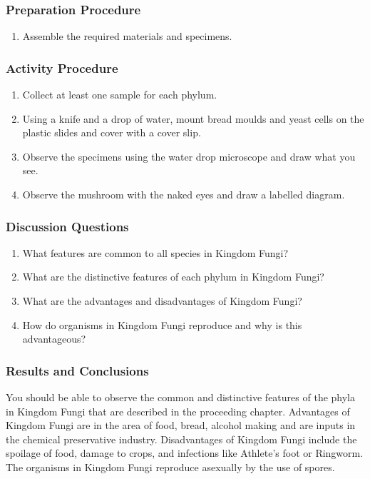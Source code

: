 \subsubsection*{Preparation Procedure}
\begin{enumerate}
\item{Assemble the required materials and specimens.}
\end{enumerate}

\subsubsection*{Activity Procedure}
\begin{enumerate}
\item{Collect at least one sample for each phylum.}
\item{Using a knife and a drop of water, mount bread moulds and yeast cells on the plastic slides and cover with a cover slip.}
\item{Observe the specimens using the water drop microscope and draw what you see.}
\item{Observe the mushroom with the naked eyes and draw a labelled diagram.}
\end{enumerate}

\subsubsection*{Discussion Questions}
\begin{enumerate}
\item{What features are common to all species in Kingdom Fungi?}
\item{What are the distinctive features of each phylum in Kingdom Fungi?}
\item{What are the advantages and disadvantages of Kingdom Fungi?}
\item{How do organisms in Kingdom Fungi reproduce and why is this advantageous?}
\end{enumerate}

\subsubsection*{Results and Conclusions}
You should be able to observe the common and distinctive features of the phyla in Kingdom Fungi that are described in the proceeding chapter. Advantages of Kingdom Fungi are in the area of food, bread, alcohol making and are inputs in the chemical preservative industry. Disadvantages of Kingdom Fungi include the spoilage of food, damage to crops, and infections like Athlete's foot or Ringworm. The organisms in Kingdom Fungi reproduce asexually by the use of spores.


